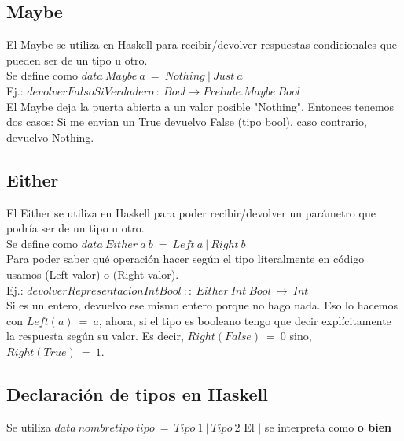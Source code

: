 \documentclass[10pt,a4paper]{article}
\begin{document}
\subsection*{Maybe}
El Maybe se utiliza en Haskell para recibir/devolver respuestas condicionales que pueden ser de un tipo u otro. \\

Se define como $data \ Maybe \ a \ = \ Nothing \ | \ Just \ a$ \\

Ej.: $ devolverFalsoSiVerdadero \:: \ Bool \rightarrow Prelude.Maybe \ Bool $ \\

El Maybe deja la puerta abierta a un valor posible "Nothing". Entonces tenemos dos casos: Si me envian un True devuelvo False (tipo bool), caso contrario, devuelvo Nothing. 

\subsection*{Either}
El Either se utiliza en Haskell para poder recibir/devolver un parámetro que podría ser de un tipo u otro. \\
Se define como $ data \ Either \ a \ b \ = \ Left \ a \ | \ Right \ b $ \\

Para poder saber qué operación hacer según el tipo literalmente en código usamos (Left valor) o (Right valor). \\

Ej.: $ devolverRepresentacionIntBool \ :: \ Either \ Int \ Bool \ \rightarrow \ Int $ \\

Si es un entero, devuelvo ese mismo entero porque no hago nada. Eso lo hacemos con $Left(a) \ = \ a$, ahora, si el tipo es booleano tengo que decir explícitamente la respuesta según su valor. Es decir, $Right(False) \ = \ 0$ sino, $Right(True) \ = \ 1$.

\subsection*{Declaración de tipos en Haskell}
Se utiliza $data \ nombretipo \ tipo \ = \ Tipo \ 1 \ | \ Tipo \ 2$ 
El $|$ se interpreta como \textbf{o bien}
\end{document}
